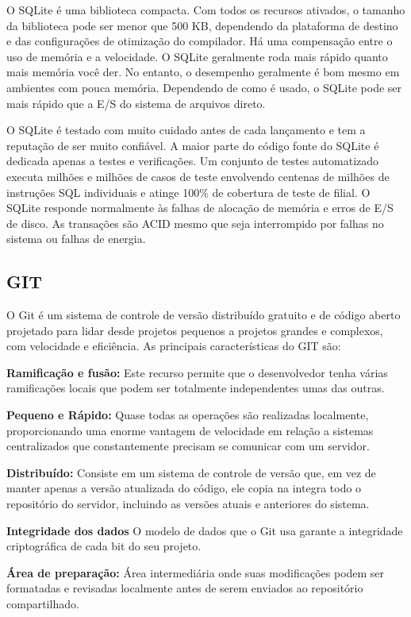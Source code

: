 {{{{{{{O SQLite é uma biblioteca compacta. Com todos os recursos ativados, o tamanho da biblioteca pode ser menor que 500 KB, dependendo da plataforma de destino e das configurações de otimização do compilador. Há uma compensação entre o uso de memória e a velocidade. O SQLite geralmente roda mais rápido quanto mais memória você der. No entanto, o desempenho geralmente é bom mesmo em ambientes com pouca memória. Dependendo de como é usado, o SQLite pode ser mais rápido que a E/S do sistema de arquivos direto.

O SQLite é testado com muito cuidado antes de cada lançamento e tem a reputação de ser muito confiável. A maior parte do código fonte do SQLite é dedicada apenas a testes e verificações. Um conjunto de testes automatizado executa milhões e milhões de casos de teste envolvendo centenas de milhões de instruções SQL individuais e atinge 100\% de cobertura de teste de filial. O SQLite responde normalmente às falhas de alocação de memória e erros de E/S de disco. As transações são ACID mesmo que seja interrompido por falhas no sistema ou falhas de energia.

\subsection{GIT}

O Git é um sistema de controle de versão distribuído gratuito e de código aberto projetado para lidar desde projetos pequenos a projetos grandes e complexos, com velocidade e eficiência. As principais características do GIT são:

\begin{lista}
\item \textbf{Ramificação e fusão:} Este recurso permite que o desenvolvedor tenha várias ramificações locais que podem ser totalmente independentes umas das outras.
\item \textbf{Pequeno e Rápido:} Quase todas as operações são realizadas localmente, proporcionando uma enorme vantagem de velocidade em relação a sistemas centralizados que constantemente precisam se comunicar com um servidor.
\item \textbf{Distribuído:} Consiste em um sistema de controle de versão que, em vez de manter apenas a versão atualizada do código, ele copia na integra todo o repositório do servidor, incluindo as versões atuais e anteriores do sistema.
\item \textbf{Integridade dos dados} O modelo de dados que o Git usa garante a integridade criptográfica de cada bit do seu projeto.
\item \textbf{Área de preparação:} Área intermediária onde suas modificações podem ser formatadas e revisadas localmente antes de serem enviados ao repositório compartilhado.
\end{lista}

}}}}}}}
